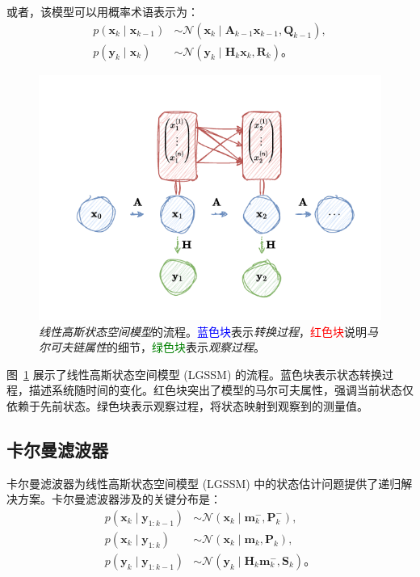 或者，该模型可以用概率术语表示为：
\begin{align*}
 p(\mathbf{x}_k \mid \mathbf{x}_{k-1}) &\sim \mathcal{N}(\mathbf{x}_k \mid \mathbf{A}_{k-1} \mathbf{x}_{k-1}, \mathbf{Q}_{k-1}), \\
 p(\mathbf{y}_k \mid \mathbf{x}_k) &\sim \mathcal{N}(\mathbf{y}_k \mid \mathbf{H}_k \mathbf{x}_k, \mathbf{R}_k)。
\end{align*}

\begin{figure}[tb]
\centering
\includegraphics[width=0.75\linewidth]{fig/Markov Chian.pdf}
\caption{\textit{线性高斯状态空间模型}的流程。\textcolor{blue}{蓝色块}表示\textit{转换过程}，\textcolor{red}{红色块}说明\textit{马尔可夫链属性}的细节，\textcolor{green}{绿色块}表示\textit{观察过程}。}
\label{fig: LGSSM 流程图}
\end{figure}

图~\ref{fig: LGSSM 流程图} 展示了线性高斯状态空间模型 (LGSSM) 的流程。蓝色块表示状态转换过程，描述系统随时间的变化。红色块突出了模型的马尔可夫属性，强调当前状态仅依赖于先前状态。绿色块表示观察过程，将状态映射到观察到的测量值。

\subsection{卡尔曼滤波器}
卡尔曼滤波器为线性高斯状态空间模型 (LGSSM) 中的状态估计问题提供了递归解决方案。卡尔曼滤波器涉及的关键分布是：
\begin{align}
 p(\mathbf{x}_k \mid \mathbf{y}_{1:k-1}) &\sim \mathcal{N}(\mathbf{x}_k \mid \mathbf{m}_k^-, \mathbf{P}_k^-), \\
 p(\mathbf{x}_k \mid \mathbf{y}_{1:k}) &\sim \mathcal{N}(\mathbf{x}_k \mid \mathbf{m}_k, \mathbf{P}_k), \\
 p(\mathbf{y}_k \mid \mathbf{y}_{1:k-1}) &\sim \mathcal{N}(\mathbf{y}_k \mid \mathbf{H}_k \mathbf{m}_k^-, \mathbf{S}_k)。\label{eq: single likelihood}
\end{align}

